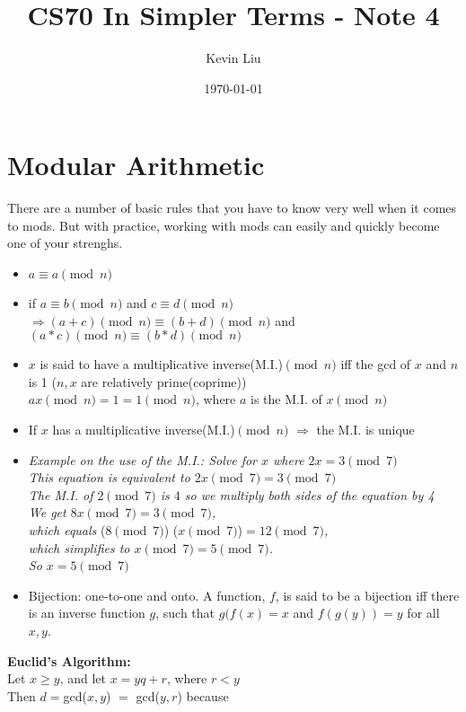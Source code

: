 \documentclass[a4paper]{article}
\title{CS70 In Simpler Terms - Note 4}
\author{Kevin Liu}
\date{\today}
\begin{document}
\maketitle

\section{Modular Arithmetic}
There are a number of basic rules that you have to know very well when it comes to mods. But with practice, working with mods can easily and quickly become one of your strenghs.
\begin{itemize}
    \item $a \equiv a\pmod n$
    \item if $a \equiv b \pmod n$ and $c \equiv d \pmod n$ \\
            $\Rightarrow (a+c)\pmod n \equiv (b+d)\pmod n$ and \\
            $(a*c)\pmod n \equiv (b*d)\pmod n$
    \item $x$ is said to have a multiplicative inverse(M.I.)$\pmod n$ iff the gcd of $x$ and $n$ is 1 ($n, x$ are relatively prime(coprime))\\
    $ax\pmod n = 1 = 1\pmod n$, where $a$ is the M.I. of $x\pmod n$
    \item If $x$ has a multiplicative inverse(M.I.)$\pmod n$ $\Rightarrow$ the M.I. is unique
    \item \textit{Example on the use of the M.I.: Solve for $x$ where $2x = 3\pmod 7$\\ This equation is equivalent to $2x\pmod 7 = 3\pmod 7$\\ The M.I. of $2\pmod 7$ is $4$ so we multiply both sides of the equation by 4\\ We get $8x\pmod 7 = 3\pmod 7$,\\ which equals} ($8\pmod 7$) ($x\pmod 7$)\textit{$= 12\pmod 7$, \\
    which simplifies to $x\pmod 7 = 5\pmod 7$. \\So $x=5\pmod 7$}
    \item Bijection: one-to-one and onto. A function, $f$, is said to be a bijection iff there is an inverse function $g$, such that $g(f(x) = x$ and $f(g(y)) = y$ for all $x,y$.

\end{itemize}
\textbf{Euclid's Algorithm:} \\
Let $x \geq y$, and let $x = yq + r$, where $r < y$\\ Then $d=$gcd($x,y$) $=$ gcd($y,r$) because\\
\end{document}

